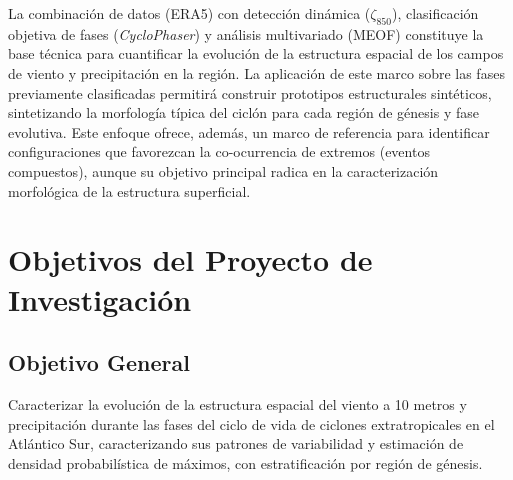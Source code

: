 La combinación de datos (ERA5) con detección dinámica ($\zeta_{850}$), clasificación objetiva de fases (\textit{CycloPhaser}) y análisis multivariado (MEOF) constituye la base técnica para cuantificar la evolución de la estructura espacial de los campos de viento y precipitación en la región. La aplicación de este marco sobre las fases previamente clasificadas permitirá construir prototipos estructurales sintéticos, sintetizando la morfología típica del ciclón para cada región de génesis y fase evolutiva. Este enfoque ofrece, además, un marco de referencia para identificar configuraciones que favorezcan la co-ocurrencia de extremos (eventos compuestos), aunque su objetivo principal radica en la caracterización morfológica de la estructura superficial.


\section{Objetivos del Proyecto de Investigación}

\subsection{Objetivo General}
Caracterizar la evolución de la estructura espacial del viento a 10 metros y precipitación durante las fases del ciclo de vida de ciclones extratropicales en el Atlántico Sur, caracterizando sus patrones de variabilidad y estimación de densidad probabilística de máximos, con estratificación por región de génesis.

